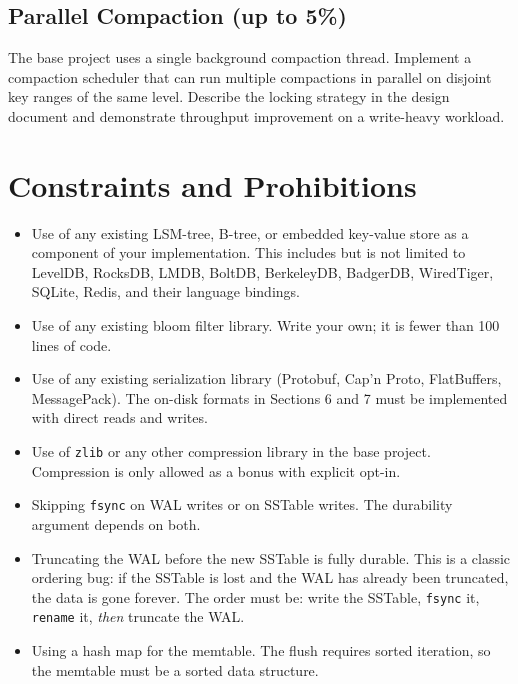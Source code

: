 \documentclass[11pt,a4paper]{article}
\begin{document}
\subsection{Parallel Compaction (up to 5\%)}
The base project uses a single background compaction thread. Implement a compaction scheduler that can run multiple compactions in parallel on disjoint key ranges of the same level. Describe the locking strategy in the design document and demonstrate throughput improvement on a write-heavy workload.

\section{Constraints and Prohibitions}

\begin{notebox}
\begin{itemize}
\item Use of any existing LSM-tree, B-tree, or embedded key-value store as a component of your implementation. This includes but is not limited to LevelDB, RocksDB, LMDB, BoltDB, BerkeleyDB, BadgerDB, WiredTiger, SQLite, Redis, and their language bindings.

\item Use of any existing bloom filter library. Write your own; it is fewer than 100 lines of code.

\item Use of any existing serialization library (Protobuf, Cap'n Proto, FlatBuffers, MessagePack). The on-disk formats in Sections 6 and 7 must be implemented with direct reads and writes.

\item Use of \texttt{zlib} or any other compression library in the base project. Compression is only allowed as a bonus with explicit opt-in.

\item Skipping \texttt{fsync} on WAL writes or on SSTable writes. The durability argument depends on both.

\item Truncating the WAL before the new SSTable is fully durable. This is a classic ordering bug: if the SSTable is lost and the WAL has already been truncated, the data is gone forever. The order must be: write the SSTable, \texttt{fsync} it, \texttt{rename} it, \textit{then} truncate the WAL.

\item Using a hash map for the memtable. The flush requires sorted iteration, so the memtable must be a sorted data structure.


\end{itemize}
\end{notebox}
\end{document}

